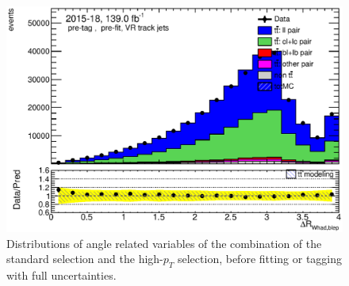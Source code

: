 \documentclass[letterpaper,12pt]{article}
\begin{document}
\begin{figure}[H]
\begin{minipage}[b]{.45\textwidth}
	\includegraphics[width=1\textwidth]{Oct_distributions/pretagNoRwDL1rwithhighpTVRJets_scaledall/DataMC_dRWhadblep.eps} 
	\end{minipage}
	\caption{Distributions of angle related variables of the combination 
	of the standard selection and the high-$p_T$ 
	selection, before fitting or tagging with full uncertainties.} \label{fig:angles_VRJets}
	\end{figure}
	
\end{document}
